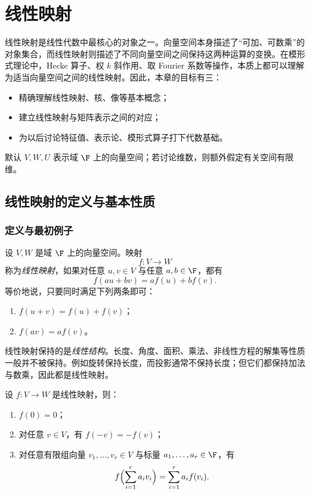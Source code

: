 \chapter{线性映射}

线性映射是线性代数中最核心的对象之一。向量空间本身描述了“可加、可数乘”的对象集合，而线性映射则描述了不同向量空间之间保持这两种运算的变换。在模形式理论中，Hecke 算子、权 $k$ 斜作用、取 Fourier 系数等操作，本质上都可以理解为适当向量空间之间的线性映射。因此，本章的目标有三：
\begin{itemize}
  \item 精确理解线性映射、核、像等基本概念；
  \item 建立线性映射与矩阵表示之间的对应；
  \item 为以后讨论特征值、表示论、模形式算子打下代数基础。
\end{itemize}

默认 $V,W,U$ 表示域 $\F$ 上的向量空间；若讨论维数，则额外假定有关空间有限维。

\section{线性映射的定义与基本性质}

\subsection{定义与最初例子}

\begin{definition}
设 $V,W$ 是域 $\F$ 上的向量空间。映射
\[
  f\colon V\to W
\]
称为\emph{线性映射}，如果对任意 $u,v\in V$ 与任意 $a,b\in \F$，都有
\[
  f(au+bv)=af(u)+bf(v).
\]
等价地说，只要同时满足下列两条即可：
\begin{enumerate}[label=\textnormal{(\arabic*)}]
  \item $f(u+v)=f(u)+f(v)$；
  \item $f(av)=af(v)$。
\end{enumerate}
\end{definition}

\begin{remark}
线性映射保持的是\emph{线性结构}。长度、角度、面积、乘法、非线性方程的解集等性质一般并不被保持。例如旋转保持长度，而投影通常不保持长度；但它们都保持加法与数乘，因此都是线性映射。
\end{remark}

\begin{proposition}
设 $f\colon V\to W$ 是线性映射，则：
\begin{enumerate}[label=\textnormal{(\arabic*)}]
  \item $f(0)=0$；
  \item 对任意 $v\in V$，有 $f(-v)=-f(v)$；
  \item 对任意有限组向量 $v_1,\dots,v_r\in V$ 与标量 $a_1,\dots,a_r\in\F$，有
  \[
    f\Bigl(\sum_{i=1}^r a_i v_i\Bigr)=\sum_{i=1}^r a_i f(v_i).
  \]
\end{enumerate}
\end{proposition}

